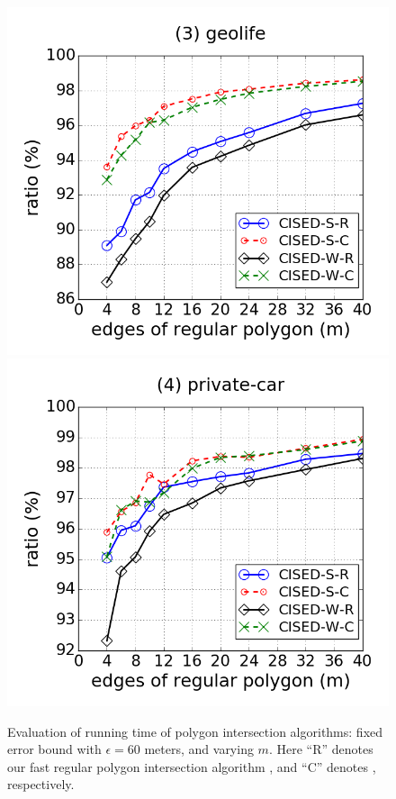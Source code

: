 \begin{figure}[tb!]
\includegraphics[scale = 0.250]{figures/Exp-M-poly-time-ratio-geolife.png}
\includegraphics[scale = 0.250]{figures/Exp-M-poly-time-ratio-private.png}
\vspace{-2ex}
\caption{\small Evaluation of running time of polygon intersection algorithms: fixed error bound with $\epsilon=60$ meters, and varying $m$. Here ``R'' denotes our fast regular polygon intersection algorithm \rpia, and ``C'' denotes \cpia, respectively.}
\label{fig:m-poly-time}
\vspace{-2ex}
\end{figure}



